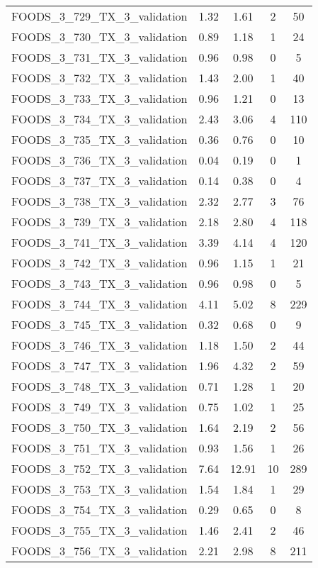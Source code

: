 \begin{table}
\begin{tabular}{|l|c|c|c|c|}
FOODS\_3\_729\_TX\_3\_validation & 1.32 & 1.61 & 2 & 50 \\
FOODS\_3\_730\_TX\_3\_validation & 0.89 & 1.18 & 1 & 24 \\
FOODS\_3\_731\_TX\_3\_validation & 0.96 & 0.98 & 0 & 5 \\
FOODS\_3\_732\_TX\_3\_validation & 1.43 & 2.00 & 1 & 40 \\
FOODS\_3\_733\_TX\_3\_validation & 0.96 & 1.21 & 0 & 13 \\
FOODS\_3\_734\_TX\_3\_validation & 2.43 & 3.06 & 4 & 110 \\
FOODS\_3\_735\_TX\_3\_validation & 0.36 & 0.76 & 0 & 10 \\
FOODS\_3\_736\_TX\_3\_validation & 0.04 & 0.19 & 0 & 1 \\
FOODS\_3\_737\_TX\_3\_validation & 0.14 & 0.38 & 0 & 4 \\
FOODS\_3\_738\_TX\_3\_validation & 2.32 & 2.77 & 3 & 76 \\
FOODS\_3\_739\_TX\_3\_validation & 2.18 & 2.80 & 4 & 118 \\
FOODS\_3\_741\_TX\_3\_validation & 3.39 & 4.14 & 4 & 120 \\
FOODS\_3\_742\_TX\_3\_validation & 0.96 & 1.15 & 1 & 21 \\
FOODS\_3\_743\_TX\_3\_validation & 0.96 & 0.98 & 0 & 5 \\
FOODS\_3\_744\_TX\_3\_validation & 4.11 & 5.02 & 8 & 229 \\
FOODS\_3\_745\_TX\_3\_validation & 0.32 & 0.68 & 0 & 9 \\
FOODS\_3\_746\_TX\_3\_validation & 1.18 & 1.50 & 2 & 44 \\
FOODS\_3\_747\_TX\_3\_validation & 1.96 & 4.32 & 2 & 59 \\
FOODS\_3\_748\_TX\_3\_validation & 0.71 & 1.28 & 1 & 20 \\
FOODS\_3\_749\_TX\_3\_validation & 0.75 & 1.02 & 1 & 25 \\
FOODS\_3\_750\_TX\_3\_validation & 1.64 & 2.19 & 2 & 56 \\
FOODS\_3\_751\_TX\_3\_validation & 0.93 & 1.56 & 1 & 26 \\
FOODS\_3\_752\_TX\_3\_validation & 7.64 & 12.91 & 10 & 289 \\
FOODS\_3\_753\_TX\_3\_validation & 1.54 & 1.84 & 1 & 29 \\
FOODS\_3\_754\_TX\_3\_validation & 0.29 & 0.65 & 0 & 8 \\
FOODS\_3\_755\_TX\_3\_validation & 1.46 & 2.41 & 2 & 46 \\
FOODS\_3\_756\_TX\_3\_validation & 2.21 & 2.98 & 8 & 211 \\

\end{tabular}
\end{table}
